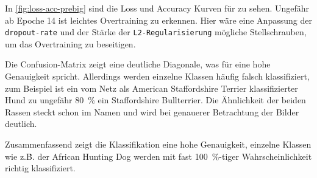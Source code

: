 In \autoref{fig:loss-acc-prebig} sind die Loss und Accuracy Kurven für \PreBig{}
zu sehen. Ungefähr ab Epoche 14 ist leichtes Overtraining zu erkennen. Hier
wäre eine Anpassung der \texttt{dropout-rate} und der Stärke der \texttt{L2-Regularisierung}
mögliche Stellschrauben, um das Overtraining zu beseitigen.

Die Confusion-Matrix zeigt eine deutliche Diagonale, was für eine hohe
Genauigkeit spricht. Allerdings werden einzelne Klassen häufig falsch
klassifiziert, zum Beispiel ist ein vom Netz als American Staffordshire Terrier
klassifizierter Hund zu ungefähr \SI{80}{\percent} ein Staffordshire
Bullterrier. Die Ähnlichkeit der beiden Rassen steckt schon im Namen und wird
bei genauerer Betrachtung der Bilder deutlich.

Zusammenfassend zeigt die Klassifikation eine hohe Genauigkeit,
einzelne Klassen wie z.\.B. der African Hunting Dog werden mit fast \SI{100}{\percent}-tiger
Wahrscheinlichkeit richtig klassifiziert.



\subsection{\PreDog}



